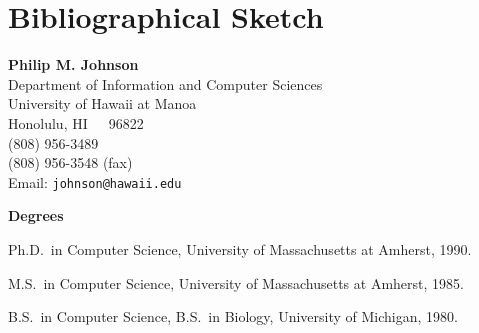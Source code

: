 

\newcommand{\newcategory}[1]{\newenvironment{#1}
 {\sectionheading{#1}\begin{description}}{\end{description}\par}}
\newcommand{\sectionheading}[1]{\medskip\pagebreak[2]\par\noindent
 {\small\bf #1}\nopagebreak}

\newcategory{Degrees}
\newcategory{Five Closely Related Publications and Systems}
\newcategory{Five Other Significant Publications}




\section{Bibliographical Sketch}


\begin{center}
{\bf Philip M. Johnson}\\
Department of Information and Computer Sciences\\
University of Hawaii at Manoa\\
Honolulu, HI~~~96822\\
(808) 956-3489\\
(808) 956-3548 (fax)\\
Email: {\tt johnson@hawaii.edu}
\end{center}

\begin{Degrees} 
\item Ph.D.~in Computer Science, University of Massachusetts at Amherst, 1990. 
\item M.S.~in Computer Science, University of Massachusetts at Amherst, 1985.
\item B.S.~in Computer Science, B.S.~in Biology, University of Michigan, 1980.  
\end{Degrees}

